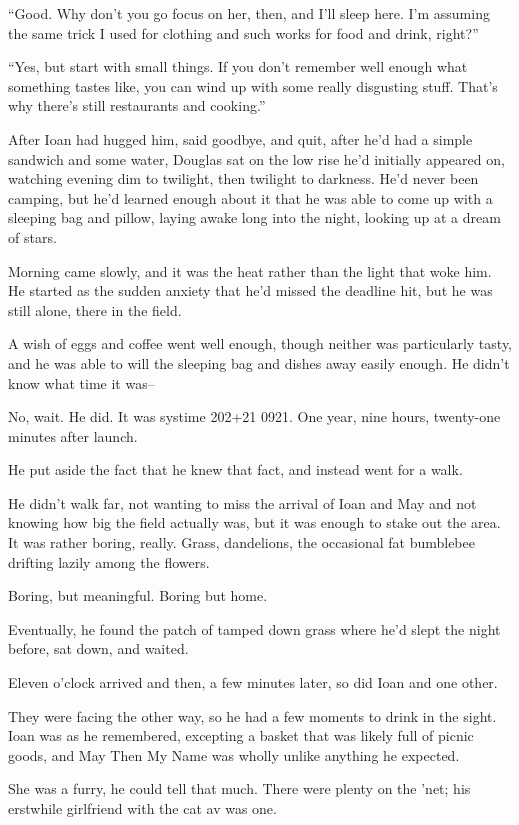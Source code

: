 ``Good. Why don't you go focus on her, then, and I'll sleep here. I'm assuming the same trick I used for clothing and such works for food and drink, right?''

``Yes, but start with small things. If you don't remember well enough what something tastes like, you can wind up with some really disgusting stuff. That's why there's still restaurants and cooking.''

After Ioan had hugged him, said goodbye, and quit, after he'd had a simple sandwich and some water, Douglas sat on the low rise he'd initially appeared on, watching evening dim to twilight, then twilight to darkness. He'd never been camping, but he'd learned enough about it that he was able to come up with a sleeping bag and pillow, laying awake long into the night, looking up at a dream of stars.

Morning came slowly, and it was the heat rather than the light that woke him. He started as the sudden anxiety that he'd missed the deadline hit, but he was still alone, there in the field.

A wish of eggs and coffee went well enough, though neither was particularly tasty, and he was able to will the sleeping bag and dishes away easily enough. He didn't know what time it was--

No, wait. He did. It was systime 202+21 0921. One year, nine hours, twenty-one minutes after launch.

He put aside the fact that he knew that fact, and instead went for a walk.

He didn't walk far, not wanting to miss the arrival of Ioan and May and not knowing how big the field actually was, but it was enough to stake out the area. It was rather boring, really. Grass, dandelions, the occasional fat bumblebee drifting lazily among the flowers.

Boring, but meaningful. Boring but home.

Eventually, he found the patch of tamped down grass where he'd slept the night before, sat down, and waited.

Eleven o'clock arrived and then, a few minutes later, so did Ioan and one other.

They were facing the other way, so he had a few moments to drink in the sight. Ioan was as he remembered, excepting a basket that was likely full of picnic goods, and May Then My Name was wholly unlike anything he expected.

She was a furry, he could tell that much. There were plenty on the 'net; his erstwhile girlfriend with the cat av was one.

